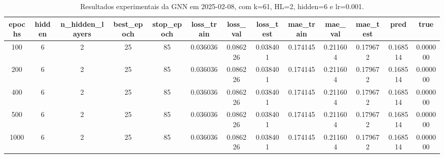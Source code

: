 \begin{table}[h]
\centering
\caption{Resultados experimentais da GNN em 2025-02-08, com k=61, HL=2, hidden=6 e lr=0.001.}
\label{tab:gnn_results_k61_hl2_h6_d20250208}
\begin{tabular}{ccccccccccccc}
\toprule
epochs & hidden & n\_hidden\_layers & best\_epoch & stop\_epoch & loss\_train & loss\_val & loss\_test & mae\_train & mae\_val & mae\_test & pred & true \\
\midrule
100 & 6 & 2 & 25 & 85 & 0.036036 & 0.086226 & 0.038401 & 0.174145 & 0.211604 & 0.179672 & 0.168514 & 0.000000 \\
200 & 6 & 2 & 25 & 85 & 0.036036 & 0.086226 & 0.038401 & 0.174145 & 0.211604 & 0.179672 & 0.168514 & 0.000000 \\
400 & 6 & 2 & 25 & 85 & 0.036036 & 0.086226 & 0.038401 & 0.174145 & 0.211604 & 0.179672 & 0.168514 & 0.000000 \\
500 & 6 & 2 & 25 & 85 & 0.036036 & 0.086226 & 0.038401 & 0.174145 & 0.211604 & 0.179672 & 0.168514 & 0.000000 \\
1000 & 6 & 2 & 25 & 85 & 0.036036 & 0.086226 & 0.038401 & 0.174145 & 0.211604 & 0.179672 & 0.168514 & 0.000000 \\
\bottomrule
\end{tabular}
\end{table}
